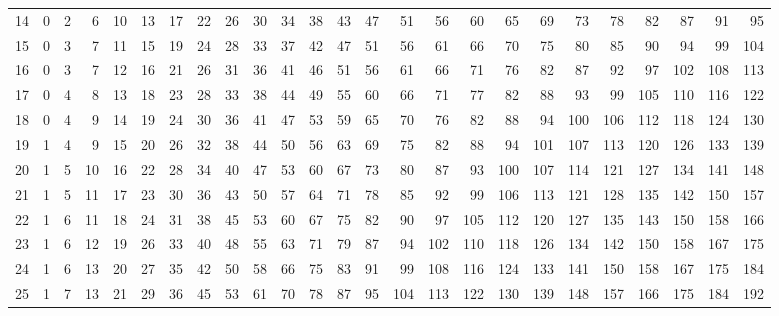 \begin{center}
{\begin{tabular}{c*{24}{r}}
			14 & 0 & 2 & 6 & 10 & 13 & 17 & 22 & 26 & 30 & 34 & 38 & 43 & 47 & 51 & 56 & 60 & 65 & 69 & 73 & 78 & 82 & 87 & 91 & 95 \\
			15 & 0 & 3 & 7 & 11 & 15 & 19 & 24 & 28 & 33 & 37 & 42 & 47 & 51 & 56 & 61 & 66 & 70 & 75 & 80 & 85 & 90 & 94 & 99 & 104 \\
			16 & 0 & 3 & 7 & 12 & 16 & 21 & 26 & 31 & 36 & 41 & 46 & 51 & 56 & 61 & 66 & 71 & 76 & 82 & 87 & 92 & 97 & 102 & 108 & 113 \\
			17 & 0 & 4 & 8 & 13 & 18 & 23 & 28 & 33 & 38 & 44 & 49 & 55 & 60 & 66 & 71 & 77 & 82 & 88 & 93 & 99 & 105 & 110 & 116 & 122 \\
			18 & 0 & 4 & 9 & 14 & 19 & 24 & 30 & 36 & 41 & 47 & 53 & 59 & 65 & 70 & 76 & 82 & 88 & 94 & 100 & 106 & 112 & 118 & 124 & 130 \\
			19 & 1 & 4 & 9 & 15 & 20 & 26 & 32 & 38 & 44 & 50 & 56 & 63 & 69 & 75 & 82 & 88 & 94 & 101 & 107 & 113 & 120 & 126 & 133 & 139 \\[5pt]
			20 & 1 & 5 & 10 & 16 & 22 & 28 & 34 & 40 & 47 & 53 & 60 & 67 & 73 & 80 & 87 & 93 & 100 & 107 & 114 & 121 & 127 & 134 & 141 & 148 \\
			21 & 1 & 5 & 11 & 17 & 23 & 30 & 36 & 43 & 50 & 57 & 64 & 71 & 78 & 85 & 92 & 99 & 106 & 113 & 121 & 128 & 135 & 142 & 150 & 157 \\
			22 & 1 & 6 & 11 & 18 & 24 & 31 & 38 & 45 & 53 & 60 & 67 & 75 & 82 & 90 & 97 & 105 & 112 & 120 & 127 & 135 & 143 & 150 & 158 & 166 \\
			23 & 1 & 6 & 12 & 19 & 26 & 33 & 40 & 48 & 55 & 63 & 71 & 79 & 87 & 94 & 102 & 110 & 118 & 126 & 134 & 142 & 150 & 158 & 167 & 175 \\
			24 & 1 & 6 & 13 & 20 & 27 & 35 & 42 & 50 & 58 & 66 & 75 & 83 & 91 & 99 & 108 & 116 & 124 & 133 & 141 & 150 & 158 & 167 & 175 & 184 \\
			25 & 1 & 7 & 13 & 21 & 29 & 36 & 45 & 53 & 61 & 70 & 78 & 87 & 95 & 104 & 113 & 122 & 130 & 139 & 148 & 157 & 166 & 175 & 184 & 192 \\
			\midrule
		\end{tabular}%
	}
\end{center}